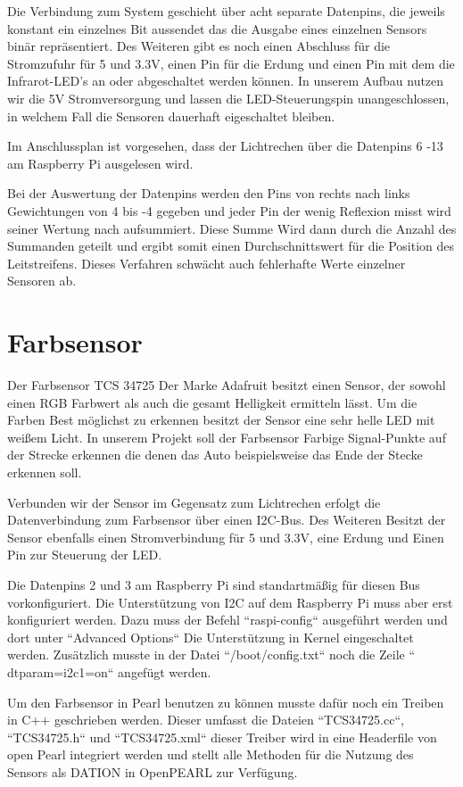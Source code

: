 Die Verbindung zum System geschieht über acht separate Datenpins, die jeweils konstant ein einzelnes Bit aussendet das die Ausgabe eines einzelnen Sensors binär repräsentiert. Des Weiteren gibt es noch einen Abschluss für die Stromzufuhr für 5 und 3.3V, einen Pin für die Erdung und einen Pin mit dem die Infrarot-LED’s an oder abgeschaltet werden können. In unserem Aufbau nutzen wir die 5V Stromversorgung und lassen die LED-Steuerungspin unangeschlossen, in welchem Fall die Sensoren dauerhaft eigeschaltet bleiben. 

Im Anschlussplan ist vorgesehen, dass der Lichtrechen über die Datenpins 6 -13 am Raspberry Pi ausgelesen wird.

Bei der Auswertung der Datenpins werden den Pins von rechts nach links Gewichtungen von 4 bis -4 gegeben und jeder Pin der wenig Reflexion misst wird seiner Wertung nach aufsummiert. Diese Summe Wird dann durch die Anzahl des Summanden geteilt und ergibt somit einen Durchschnittswert für die Position des Leitstreifens. Dieses Verfahren schwächt auch fehlerhafte Werte einzelner Sensoren ab.

\section{Farbsensor}
Der Farbsensor TCS 34725 Der Marke Adafruit besitzt einen Sensor, der sowohl einen RGB Farbwert als auch die gesamt Helligkeit ermitteln lässt. Um die Farben Best möglichst zu erkennen besitzt der Sensor eine sehr helle LED mit weißem Licht. In unserem Projekt soll der Farbsensor Farbige Signal-Punkte auf der Strecke erkennen die denen das Auto beispielsweise das Ende der Stecke erkennen soll. 

Verbunden wir der Sensor im Gegensatz zum Lichtrechen erfolgt die Datenverbindung zum Farbsensor über einen I2C-Bus. Des Weiteren Besitzt der Sensor ebenfalls einen Stromverbindung für 5 und 3.3V, eine Erdung und Einen Pin zur Steuerung der LED.

Die Datenpins 2 und 3 am Raspberry Pi sind standartmäßig für diesen Bus vorkonfiguriert. Die Unterstützung von I2C auf dem Raspberry Pi muss aber erst konfiguriert werden. Dazu muss der Befehl “raspi-config“ ausgeführt werden und dort unter “Advanced Options“ Die Unterstützung in Kernel eingeschaltet werden. Zusätzlich musste in der Datei “/boot/config.txt“ noch die Zeile “ dtparam=i2c1=on“ angefügt werden.

Um den Farbsensor in Pearl benutzen zu können musste dafür noch ein Treiben in C++ geschrieben werden. Dieser umfasst die Dateien “TCS34725.cc“, “TCS34725.h“ und “TCS34725.xml“ dieser Treiber wird in eine Headerfile von open Pearl integriert werden und stellt alle Methoden für die Nutzung des Sensors als DATION in OpenPEARL zur Verfügung.

